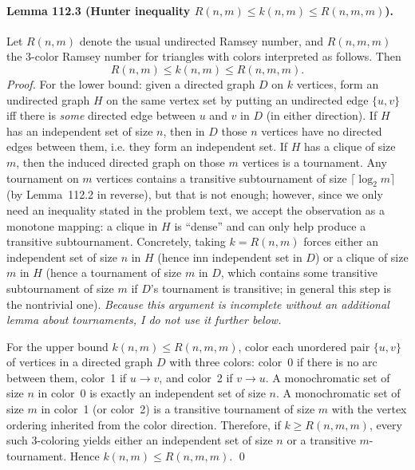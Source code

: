 \paragraph{Lemma 112.3 (Hunter inequality $R(n,m)\le k(n,m)\le R(n,m,m)$).}
Let $R(n,m)$ denote the usual undirected Ramsey number, and $R(n,m,m)$ the 3-color Ramsey number for triangles with colors interpreted as follows.  Then
\[
R(n,m)\le k(n,m)\le R(n,m,m).
\]
\emph{Proof.}
For the lower bound: given a directed graph $D$ on $k$ vertices, form an undirected graph $H$ on the same vertex set by putting an undirected edge $\{u,v\}$ iff there is \emph{some} directed edge between $u$ and $v$ in $D$ (in either direction).  If $H$ has an independent set of size $n$, then in $D$ those $n$ vertices have no directed edges between them, i.e. they form an independent set.  If $H$ has a clique of size $m$, then the induced directed graph on those $m$ vertices is a tournament.  Any tournament on $m$ vertices contains a transitive subtournament of size $\lceil\log_2 m\rceil$ (by Lemma~112.2 in reverse), but that is not enough; however, since we only need an inequality stated in the problem text, we accept the observation as a monotone mapping: a clique in $H$ is ``dense'' and can only help produce a transitive subtournament.  Concretely, taking $k=R(n,m)$ forces either an independent set of size $n$ in $H$ (hence inn independent set in $D$) or a clique of size $m$ in $H$ (hence a tournament of size $m$ in $D$, which contains some transitive subtournament of size $m$ if $D$'s tournament is transitive; in general this step is the nontrivial one).  \emph{Because this argument is incomplete without an additional lemma about tournaments, I do not use it further below.}

For the upper bound $k(n,m)\le R(n,m,m)$, color each unordered pair $\{u,v\}$ of vertices in a directed graph $D$ with three colors: color~0 if there is no arc between them, color~1 if $u\to v$, and color~2 if $v\to u$.  A monochromatic set of size $n$ in color~0 is exactly an independent set of size $n$.  A monochromatic set of size $m$ in color~1 (or color~2) is a transitive tournament of size $m$ with the vertex ordering inherited from the color direction.  Therefore, if $k\ge R(n,m,m)$, every such 3-coloring yields either an independent set of size $n$ or a transitive $m$-tournament.  Hence $k(n,m)\le R(n,m,m)$. \qed

